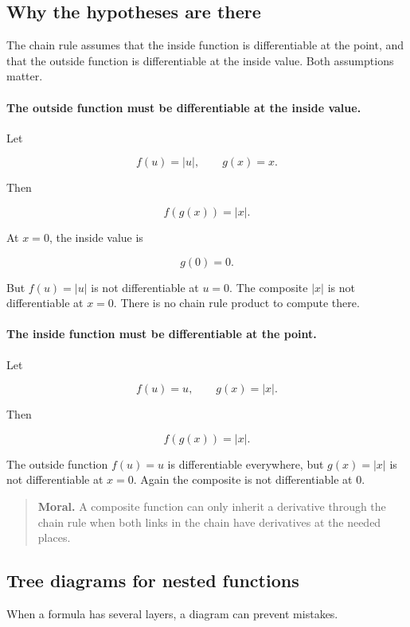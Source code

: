 \subsection{Why the hypotheses are there}
\label{subsec:chain-rule-hypotheses}

The chain rule assumes that the inside function is differentiable at the point, and that the outside function is differentiable at the inside value.  Both assumptions matter.

\paragraph{The outside function must be differentiable at the inside value.}
Let

\[
f(u)=|u|,
\qquad
g(x)=x.
\]

Then

\[
f(g(x))=|x|.
\]

At \(x=0\), the inside value is

\[
g(0)=0.
\]

But \(f(u)=|u|\) is not differentiable at \(u=0\).  The composite \(|x|\) is not differentiable at \(x=0\).  There is no chain rule product to compute there.

\paragraph{The inside function must be differentiable at the point.}
Let

\[
f(u)=u,
\qquad
g(x)=|x|.
\]

Then

\[
f(g(x))=|x|.
\]

The outside function \(f(u)=u\) is differentiable everywhere, but \(g(x)=|x|\) is not differentiable at \(x=0\).  Again the composite is not differentiable at \(0\).

\begin{quote}
\textbf{Moral.}
A composite function can only inherit a derivative through the chain rule when both links in the chain have derivatives at the needed places.
\end{quote}

\subsection{Tree diagrams for nested functions}
\label{subsec:tree-diagrams-chain-rule}

When a formula has several layers, a diagram can prevent mistakes.

